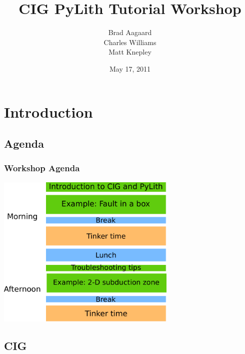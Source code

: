 \documentclass{beamer}
\title{CIG PyLith Tutorial Workshop}
\subtitle{}
\author{Brad Aagaard \\
  Charles Williams \\
  Matt Knepley}
\institute{}
\date{May 17, 2011}
\begin{document}
\maketitle


\section{Introduction}
\subsection{Agenda}

\begin{frame}
  \frametitle{Workshop Agenda}
  \summary{}

  \begin{center}
    \includegraphics[height=2.9in]{figs/overview}
  \end{center}
  
\end{frame}

\subsection{CIG}
\end{document}
